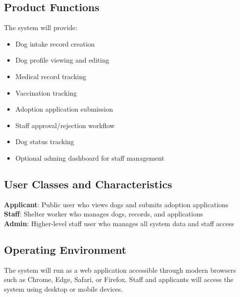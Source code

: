 \documentclass[12pt]{article}
\begin{document}
\subsection{Product Functions}
The system will provide:
\begin{itemize}\item Dog intake record creation\end{itemize}
\begin{itemize}\item Dog profile viewing and editing\end{itemize}
\begin{itemize}\item Medical record tracking\end{itemize}
\begin{itemize}\item Vaccination tracking\end{itemize}
\begin{itemize}\item Adoption application submission\end{itemize}
\begin{itemize}\item Staff approval/rejection workflow\end{itemize}
\begin{itemize}\item Dog status tracking\end{itemize}
\begin{itemize}\item Optional adming dashboard for staff management\end{itemize}
\subsection{User Classes and Characteristics}
\textbf{Applicant}: Public user who views dogs and submits adoption applications\\
\textbf{Staff}: Shelter worker who manages dogs, records, and applications\\
\textbf{Admin}: Higher-level staff user who manages all system data and staff access
\subsection{Operating Environment}
The system will run as a web application accessible through modern browsers such as Chrome, Edge, Safari, or Firefox. Staff and applicants will access the system using desktop or mobile devices.
\end{document}
